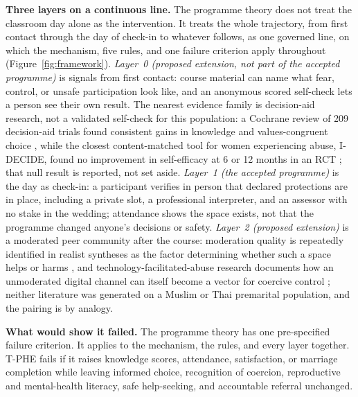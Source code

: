 \documentclass[11pt]{article}
\newcommand{\tphe}{T\mbox{-}PHE}
\begin{document}
\textbf{Three layers on a continuous line.} The programme theory does not treat the classroom day alone as the intervention. It treats the whole trajectory, from first contact through the day of check-in to whatever follows, as one governed line, on which the mechanism, five rules, and one failure criterion apply throughout (Figure~\ref{fig:framework}). \emph{Layer~0 (proposed extension, not part of the accepted programme)} is signals from first contact: course material can name what fear, control, or unsafe participation look like, and an anonymous scored self-check lets a person see their own result. The nearest evidence family is decision-aid research, not a validated self-check for this population: a Cochrane review of 209 decision-aid trials found consistent gains in knowledge and values-congruent choice \cite{ref14}, while the closest content-matched tool for women experiencing abuse, I-DECIDE, found no improvement in self-efficacy at 6 or 12 months in an RCT \cite{ref120}; that null result is reported, not set aside. \emph{Layer~1 (the accepted programme)} is the day as check-in: a participant verifies in person that declared protections are in place, including a private slot, a professional interpreter, and an assessor with no stake in the wedding; attendance shows the space exists, not that the programme changed anyone's decisions or safety. \emph{Layer~2 (proposed extension)} is a moderated peer community after the course: moderation quality is repeatedly identified in realist syntheses as the factor determining whether such a space helps or harms \cite{ref140,ref144}, and technology-facilitated-abuse research documents how an unmoderated digital channel can itself become a vector for coercive control \cite{ref149,ref150}; neither literature was generated on a Muslim or Thai premarital population, and the pairing is by analogy.

\textbf{What would show it failed.} The programme theory has one pre-specified failure criterion. It applies to the mechanism, the rules, and every layer together. \tphe{} fails if it raises knowledge scores, attendance, satisfaction, or marriage completion while leaving informed choice, recognition of coercion, reproductive and mental-health literacy, safe help-seeking, and accountable referral unchanged.
\end{document}
